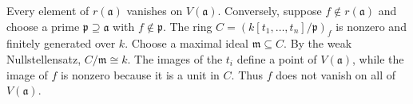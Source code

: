 Every element of $r(\mathfrak{a})$ vanishes on $V(\mathfrak{a})$. Conversely, suppose $f\notin r(\mathfrak{a})$ and choose a prime $\mathfrak{p}\supseteq\mathfrak{a}$ with $f\notin\mathfrak{p}$. The ring $C=(k[t_1,\ldots,t_n]/\mathfrak{p})_f$ is nonzero and finitely generated over $k$. Choose a maximal ideal $\mathfrak{m}\subseteq C$. By the weak Nullstellensatz, $C/\mathfrak{m}\cong k$. The images of the $t_i$ define a point of $V(\mathfrak{a})$, while the image of $f$ is nonzero because it is a unit in $C$. Thus $f$ does not vanish on all of $V(\mathfrak{a})$.
